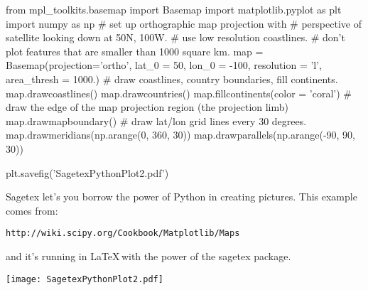 \documentclass{article}
\begin{document}
\begin{sagesilent}
from mpl_toolkits.basemap import Basemap
import matplotlib.pyplot as plt
import numpy as np
# set up orthographic map projection with
# perspective of satellite looking down at 50N, 100W.
# use low resolution coastlines.
# don't plot features that are smaller than 1000 square km.
map = Basemap(projection='ortho', lat_0 = 50, lon_0 = -100,
              resolution = 'l', area_thresh = 1000.)
# draw coastlines, country boundaries, fill continents.
map.drawcoastlines()
map.drawcountries()
map.fillcontinents(color = 'coral')
# draw the edge of the map projection region (the projection limb)
map.drawmapboundary()
# draw lat/lon grid lines every 30 degrees.
map.drawmeridians(np.arange(0, 360, 30))
map.drawparallels(np.arange(-90, 90, 30))

plt.savefig('SagetexPythonPlot2.pdf')
\end{sagesilent}
Sagetex let's you borrow the power of Python in creating pictures. This
example comes from:
\begin{verbatim}
http://wiki.scipy.org/Cookbook/Matplotlib/Maps
\end{verbatim}
and it's running in \LaTeX \,with the power of the sagetex package.
\begin{center}
\texttt{[image: SagetexPythonPlot2.pdf]}
\end{center}
\end{document}
